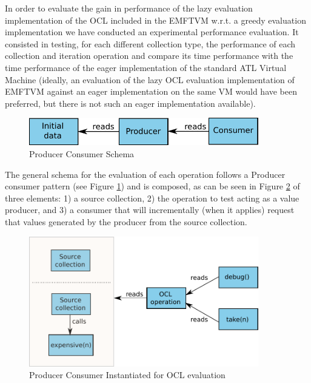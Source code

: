 In order to evaluate the gain in performance of the lazy evaluation
implementation of the OCL included in the EMFTVM w.r.t. a greedy evaluation
implementation we have conducted an experimental performance evaluation. It
consisted in testing, for each different collection type, the performance of
each collection and iteration operation and compare its time performance with
the time performance of the eager implementation of the standard ATL Virtual
Machine (ideally, an evaluation of the lazy OCL evaluation implementation of
EMFTVM against an eager implementation on the same VM would have been preferred,
but there is not such an eager implementation available).

\begin{figure}[h]
\centering
\includegraphics[width=10cm]{figures/producerConsumer}
\caption{Producer Consumer Schema}
\label{fig:producerConsumer}
\end{figure}

The general schema for the evaluation of each operation follows a Producer
consumer pattern (see Figure \ref{fig:producerConsumer}) and is composed, as can
be seen in Figure \ref{fig:producerConsumerOCL} of three elements: 1) a source
collection, 2) the operation to test acting as a value producer, and 3) a
consumer that will incrementally (when it applies) request that values generated
by the producer from the source collection.

\begin{figure}[h]
\centering
\includegraphics[width=10cm]{figures/producerConsumerOCL}
\caption{Producer Consumer Instantiated for OCL evaluation}
\label{fig:producerConsumerOCL}
\end{figure}

